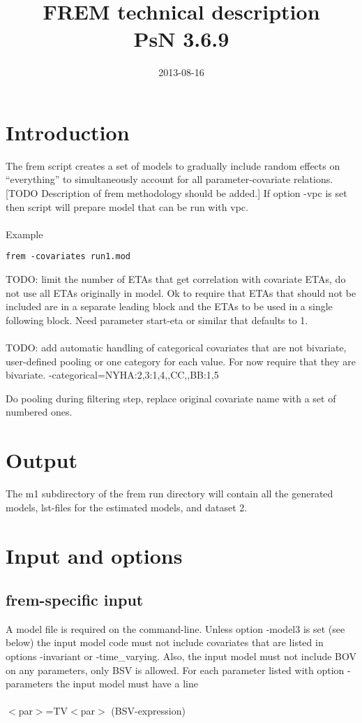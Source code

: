 \documentclass[a4paper,12pt]{article}
\title{FREM technical description\\ \vspace{2 mm} {\large PsN 3.6.9}}
\date{2013-08-16}
\begin{document}
\maketitle


\section{Introduction}

The frem script creates a set of models to gradually include random effects on “everything” to simultaneously account for all parameter-covariate relations. [TODO Description of frem methodology should be added.] If option -vpc is set then script will prepare model that can be run with vpc.
\\
\\
Example
\begin{verbatim}
frem -covariates run1.mod
\end{verbatim}


TODO: limit the number of ETAs that get correlation with covariate ETAs, do not use all ETAs originally in model. Ok to require that ETAs that should not be included are in a separate leading block and the ETAs to be used in a single following block. Need parameter start-eta or similar that defaults to 1.
\\
\\
TODO: add automatic handling of categorical covariates that are not bivariate, user-defined pooling or one category for each value. For now require that they are bivariate.
 -categorical=NYHA:2,3:1,4,,CC,,BB:1,5

Do pooling during filtering step, replace original covariate name with a set of numbered ones. 


\section{Output}
The m1 subdirectory of the frem run directory will contain all the generated models, lst-files for the estimated models, and dataset 2.

\section{Input and options}
\subsection{frem-specific input}
A model file is required on the command-line. Unless option -model3 is set (see below) the input model code must not include covariates that are listed in options -invariant or -time\_varying. Also, the input model must not include  BOV on any parameters, only BSV is allowed. For each parameter listed with option -parameters the input model must have a line 
\\
\\
$<$par$>$=TV$<$par$>$ (BSV-expression)
\end{document}
